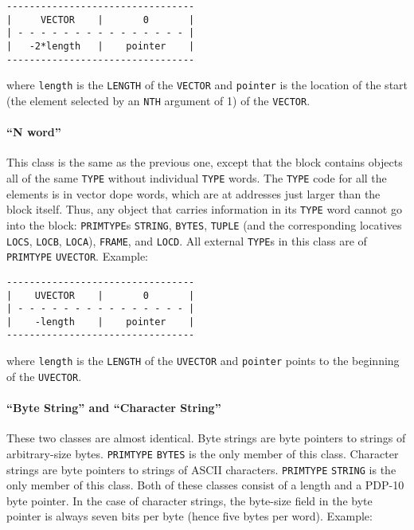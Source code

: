 \documentclass[a4paper,]{article}
\let\oldparagraph\paragraph
\renewcommand{\paragraph}[1]{\oldparagraph{#1}\mbox{}}
\begin{document}
\begin{verbatim}
---------------------------------
|     VECTOR    |       0       |
| - - - - - - - - - - - - - - - |
|   -2*length   |    pointer    |
---------------------------------
\end{verbatim}

where \texttt{length} is the \texttt{LENGTH} of the \texttt{VECTOR} and \texttt{pointer} is the location of the start (the
element selected by an \texttt{NTH} argument of 1) of the \texttt{VECTOR}.

\paragraph{\texorpdfstring{``N word''}{N word}}\label{n-word}

This class is the same as the previous one, except that the block contains objects all of the same \texttt{TYPE} without
individual \texttt{TYPE} words. The \texttt{TYPE} code for all the elements is in vector dope words, which are at addresses
just larger than the block itself. Thus, any object that carries information in its \texttt{TYPE} word cannot go into the
block: \texttt{PRIMTYPE}s \texttt{STRING}, \texttt{BYTES}, \texttt{TUPLE} (and
the corresponding locatives \texttt{LOCS}, \texttt{LOCB}, \texttt{LOCA}), \texttt{FRAME}, and
\texttt{LOCD}. All external \texttt{TYPE}s in this class are of \texttt{PRIMTYPE}
\texttt{UVECTOR}. Example:

\begin{verbatim}
---------------------------------
|    UVECTOR    |       0       |
| - - - - - - - - - - - - - - - |
|    -length    |    pointer    |
---------------------------------
\end{verbatim}

where \texttt{length} is the \texttt{LENGTH} of the \texttt{UVECTOR} and \texttt{pointer} points to the beginning of the
\texttt{UVECTOR}.

\paragraph{\texorpdfstring{``Byte String'' and ``Character
String''}{Byte String and Character String}}\label{byte-string-and-character-string}

These two classes are almost identical. Byte strings are byte pointers to strings of arbitrary-size bytes.
\texttt{PRIMTYPE} \texttt{BYTES} is the only member of this class. Character strings are byte pointers to strings of ASCII
characters. \texttt{PRIMTYPE} \texttt{STRING} is the only member of this class. Both of these classes consist of a length
and a PDP-10 byte pointer. In the case of character strings, the byte-size field in the byte pointer is always seven bits
per byte (hence five bytes per word). Example:
\end{document}
